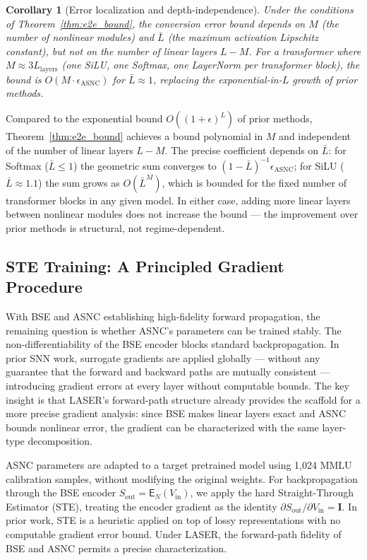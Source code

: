 \documentclass{article}
\theoremstyle{plain}
\newtheorem{corollary}[theorem]{Corollary}
\theoremstyle{definition}
\theoremstyle{remark}
\begin{document}
\begin{corollary}[Error localization and depth-independence]
\label{cor:asnc_local_main}
Under the conditions of Theorem~\ref{thm:e2e_bound}, the conversion error bound
depends on $M$ (the number of nonlinear modules) and $\bar{L}$ (the maximum
activation Lipschitz constant), but not on the number of linear layers $L - M$.
For a transformer where $M \approx 3L_{\mathrm{layers}}$ (one SiLU, one Softmax,
one LayerNorm per transformer block), the bound is $O(M \cdot \epsilon_{\mathrm{ASNC}})$
for $\bar{L} \approx 1$, replacing the exponential-in-$L$ growth of prior methods.
\end{corollary}

Compared to the exponential bound $O((1+\epsilon)^L)$ of prior methods, Theorem~\ref{thm:e2e_bound} achieves a bound polynomial in $M$ and independent of the number of linear layers $L-M$. The precise coefficient depends on $\bar{L}$: for Softmax ($\bar{L} \le 1$) the geometric sum converges to $(1-\bar{L})^{-1}\epsilon_{\mathrm{ASNC}}$; for SiLU ($\bar{L} \approx 1.1$) the sum grows as $O(\bar{L}^M)$, which is bounded for the fixed number of transformer blocks in any given model. In either case, adding more linear layers between nonlinear modules does not increase the bound — the improvement over prior methods is structural, not regime-dependent.

\subsection{STE Training: A Principled Gradient Procedure}
\label{subsec:ste}

With BSE and ASNC establishing high-fidelity forward propagation, the remaining question is whether ASNC's parameters can be trained stably. The non-differentiability of the BSE encoder blocks standard backpropagation. In prior SNN work, surrogate gradients are applied globally — without any guarantee that the forward and backward paths are mutually consistent — introducing gradient errors at every layer without computable bounds. The key insight is that LASER's forward-path structure already provides the scaffold for a more precise gradient analysis: since BSE makes linear layers exact and ASNC bounds nonlinear error, the gradient can be characterized with the same layer-type decomposition.

ASNC parameters are adapted to a target pretrained model using 1,024 MMLU calibration samples, without modifying the original weights. For backpropagation through the BSE encoder $S_{\mathrm{out}} = \mathsf{E}_N(V_{\mathrm{in}})$, we apply the hard Straight-Through Estimator (STE), treating the encoder gradient as the identity $\partial S_{\mathrm{out}} / \partial V_{\mathrm{in}} = \mathbf{I}$. In prior work, STE is a heuristic applied on top of lossy representations with no computable gradient error bound. Under LASER, the forward-path fidelity of BSE and ASNC permits a precise characterization.
\end{document}
